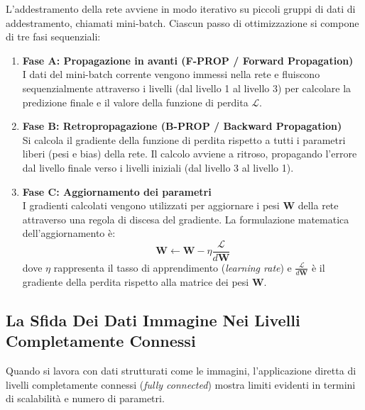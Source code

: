 ﻿\documentclass[11pt, a4paper]{article}
\begin{document}
L'addestramento della rete avviene in modo iterativo su piccoli gruppi di dati di addestramento, chiamati mini-batch. Ciascun passo di ottimizzazione si compone di tre fasi sequenziali:


\begin{enumerate}
    \item \textbf{Fase A: Propagazione in avanti (F-PROP / Forward Propagation)} \\
    I dati del mini-batch corrente vengono immessi nella rete e fluiscono sequenzialmente attraverso i livelli (dal livello 1 al livello 3) per calcolare la predizione finale e il valore della funzione di perdita $\mathcal{L}$.
    \item \textbf{Fase B: Retropropagazione (B-PROP / Backward Propagation)} \\
    Si calcola il gradiente della funzione di perdita rispetto a tutti i parametri liberi (pesi e bias) della rete. Il calcolo avviene a ritroso, propagando l'errore dal livello finale verso i livelli iniziali (dal livello 3 al livello 1).
    \item \textbf{Fase C: Aggiornamento dei parametri} \\
    I gradienti calcolati vengono utilizzati per aggiornare i pesi $\bm{W}$ della rete attraverso una regola di discesa del gradiente. La formulazione matematica dell'aggiornamento è:
    \[ \boxed{\bm{W} \leftarrow \bm{W} - \eta \frac{\mathcal{L}}{d\bm{W}}} \]
    dove $\eta$ rappresenta il tasso di apprendimento (\emph{learning rate}) e $\frac{\mathcal{L}}{d\bm{W}}$ è il gradiente della perdita rispetto alla matrice dei pesi $\bm{W}$.
\end{enumerate}

\newpage

\subsection{La Sfida Dei Dati Immagine Nei Livelli Completamente Connessi}

Quando si lavora con dati strutturati come le immagini, l'applicazione diretta di livelli completamente connessi (\emph{fully connected}) mostra limiti evidenti in termini di scalabilità e numero di parametri.

\end{document}
